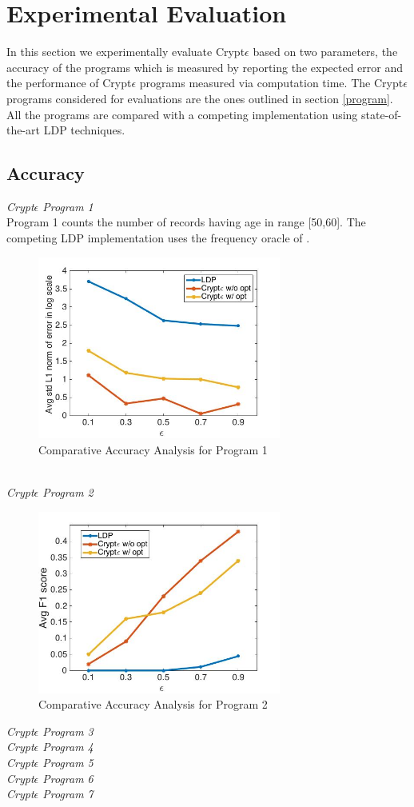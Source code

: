 \section{Experimental Evaluation}
In this section we experimentally evaluate  Crypt$\epsilon$  based on two parameters, the accuracy of the programs  which is measured  by reporting the expected error and the performance of Crypt$\epsilon$ programs measured via computation time. The Crypt$\epsilon$ programs considered for evaluations are the ones outlined in section \ref{program}. All the programs are compared with a competing implementation using state-of-the-art LDP techniques. 
\subsection{Accuracy}
\textit{Crypt$\epsilon$ Program 1}\\
Program 1 counts the number of records having age in range [50,60].  The competing LDP implementation uses the frequency oracle of \cite{LDP1}. 
\begin{figure}[h]
\includegraphics[width=8cm]{q1.jpg}
\caption{Comparative Accuracy Analysis for Program 1}
\end{figure}
\\\textit{Crypt$\epsilon$ Program 2}\\
\begin{figure}[h]
\includegraphics[width=8cm]{Q2.jpg}
\caption{Comparative Accuracy Analysis for Program 2}
\end{figure}
\textit{Crypt$\epsilon$ Program 3}\\
\textit{Crypt$\epsilon$ Program 4}\\
\textit{Crypt$\epsilon$ Program 5}\\
\textit{Crypt$\epsilon$ Program 6}\\
\textit{Crypt$\epsilon$ Program 7}\\

